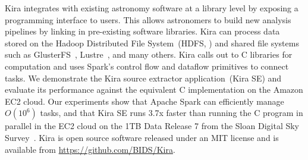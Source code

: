 \documentclass[10pt, conference, compsocconf]{IEEEtran}
\newcommand{\zhaonote}[1]{{\textcolor{cyan}    { ***Zhao:      #1 }}}
\newcommand{\franknote}[1]{{\textcolor{green}    { ***Frank:      #1 }}}
\newcommand{\zhaonote}[1]{}
\newcommand{\franknote}[1]{}
\begin{document}



Kira integrates with existing astronomy software at a library level by exposing a programming interface to users.
This allows astronomers to build new analysis pipelines by linking in pre-existing software libraries.
Kira can process data stored on the Hadoop Distributed File System~(HDFS, \cite{shvachko10}) and shared file systems such as GlusterFS~\cite{davies13}, Lustre~\cite{donovan03}, and many others.
Kira calls out to C libraries for computation and uses Spark's control flow and dataflow primitives to connect tasks.
We demonstrate the Kira source extractor application~(Kira SE) and evaluate its performance against the equivalent C implementation on the Amazon EC2 cloud.
Our experiments show that Apache Spark can efficiently manage $O(10^6)$ tasks, and that
Kira SE runs 3.7x faster than running the C program in parallel in the EC2 cloud on the 1TB Data Release 7 from the Sloan Digital Sky Survey~\cite{york00}.
Kira is open source software released under an MIT license and is available from \linebreak \url{https://github.com/BIDS/Kira}.


\end{document}
